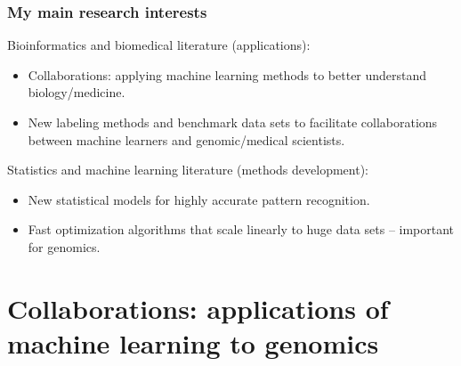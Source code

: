 \documentclass{beamer}
\begin{document}
\begin{frame}
  \frametitle{My main research interests}
  Bioinformatics and biomedical literature (applications):
  \begin{itemize}
  \item Collaborations: applying machine learning methods to
    better understand biology/medicine.
  \item New labeling methods and benchmark data sets to facilitate
    collaborations between machine learners and genomic/medical
    scientists.
  \end{itemize}
  Statistics and machine learning literature (methods development):
  \begin{itemize}
  \item New statistical models for highly accurate pattern
    recognition.
  \item Fast optimization algorithms that scale linearly to huge data
    sets -- important for genomics.
  \end{itemize}
\end{frame}

\section{Collaborations: applications of 
machine learning to genomics}
\end{document}
